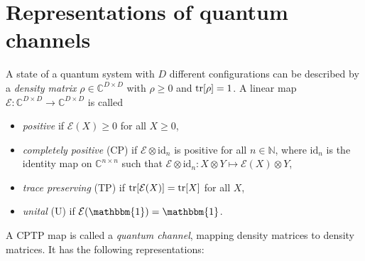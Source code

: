 \section*{Representations of quantum channels}
\noindent A state of a quantum system with $D$ different configurations can be described by a \textit{density matrix} $\rho \in \mathbb{C}^{D \times D}$ with $\rho \geq 0$ and $\tr[\rho] = 1$. A linear map $\mathcal{E}: \mathbb{C}^{D \times D} \rightarrow \mathbb{C}^{D \times D}$ is called
\begin{itemize}
	\item \textit{positive} if $\mathcal{E}(X) \geq 0$ for all $X \geq 0$,
	\item \textit{completely positive} (CP) if $\mathcal{E} \otimes \mathrm{id}_n$ is positive for all $n \in \mathbb{N}$, where $\mathrm{id}_n$ is the identity map on $\mathbb{C}^{n \times n}$ such that $\mathcal{E} \otimes \mathrm{id}_n: X \otimes Y \mapsto \mathcal{E}(X) \otimes Y$,
	\item \textit{trace preserving} (TP) if $\tr[\mathcal{E}(X)] = \tr[X]$ for all $X$,
	\item \textit{unital} (U) if $\mathcal{E}(\mathbbm{1}) = \mathbbm{1}$.
\end{itemize}
A CPTP map is called a \textit{quantum channel}, mapping density matrices to density matrices. It has the following representations:
